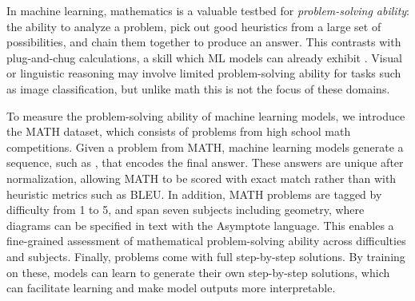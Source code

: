 \documentclass{article}
\begin{document}
In machine learning, mathematics 
is a valuable testbed 
for \emph{problem-solving ability}: the ability to analyze a problem, pick out good heuristics from a large set of possibilities, and chain them together to produce an answer. This contrasts with 
plug-and-chug calculations, 
a skill which ML models can already exhibit \citep{Henighan2020ScalingLF}. Visual or linguistic reasoning may involve limited problem-solving ability for tasks such as image classification, but unlike math this is not the focus of these domains.



To measure the problem-solving 
ability of machine learning models, we introduce the MATH 
dataset, which consists of 
 problems from high school math competitions. 
Given a problem from MATH, machine learning models generate a sequence, such as \verb==, that encodes the final answer. These 
answers are unique after normalization, allowing MATH to be scored with exact match rather than with heuristic metrics such as BLEU. In addition, MATH problems are tagged by difficulty from 1 to 5, and span seven subjects including geometry, where diagrams can be specified in text with the Asymptote language.
This enables a fine-grained assessment of mathematical problem-solving ability across difficulties and subjects.
Finally, problems come with full step-by-step solutions. 
By training on these, models can learn to generate their own step-by-step solutions, which can facilitate learning and make model outputs more interpretable.
\end{document}
